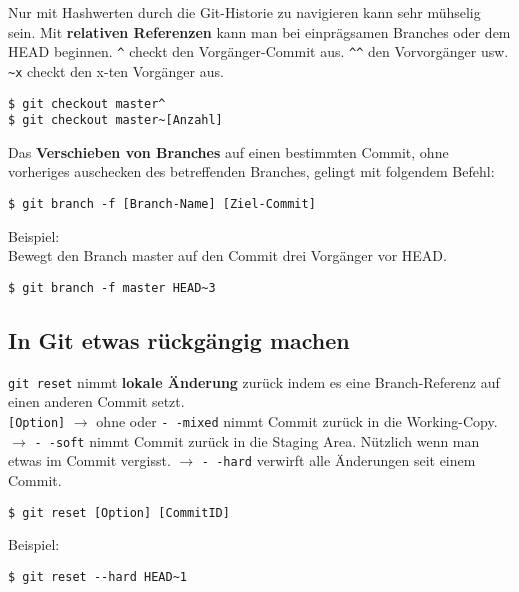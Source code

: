 \documentclass[a4paper,8pt,landscape,twocolumn]{scrartcl}
\begin{document}
\begin{orangeBox}
Nur mit Hashwerten durch die Git-Historie zu navigieren kann sehr mühselig sein. Mit \textbf{relativen Referenzen} kann man bei einprägsamen Branches oder dem HEAD beginnen. \texttt{\^{}} checkt den Vorgänger-Commit aus. \texttt{\^{}\^{}} den Vorvorgänger usw. \texttt{ \textasciitilde x} checkt den x-ten Vorgänger aus.
\begin{lstlisting}[style=bash]
$ git checkout master^
$ git checkout master~[Anzahl]
\end{lstlisting}
\end{orangeBox}

\begin{orangeBox}
Das \textbf{Verschieben von Branches} auf einen bestimmten Commit, ohne vorheriges auschecken des betreffenden Branches, gelingt mit folgendem Befehl:
\begin{lstlisting}[style=bash]
$ git branch -f [Branch-Name] [Ziel-Commit]
\end{lstlisting}
Beispiel:\\
Bewegt den Branch master auf den Commit drei Vorgänger vor HEAD.
\begin{lstlisting}[style=bash]
$ git branch -f master HEAD~3
\end{lstlisting}
\end{orangeBox}

\subsection{In Git etwas rückgängig machen}
\begin{orangeBox}
\texttt{git reset} nimmt \textbf{lokale Änderung} zurück indem es eine Branch-Referenz auf einen anderen Commit setzt.\\
\texttt{[Option]} $\rightarrow$ ohne oder \texttt{- -mixed} nimmt Commit zurück in die Working-Copy. $\rightarrow$ \texttt{- -soft} nimmt Commit zurück in die Staging Area. Nützlich wenn man etwas im Commit vergisst. $\rightarrow$ \texttt{- -hard} verwirft alle Änderungen seit einem Commit.
\begin{lstlisting}[style=bash]
$ git reset [Option] [CommitID]
\end{lstlisting}
Beispiel:
\begin{lstlisting}[style=bash]
$ git reset --hard HEAD~1
\end{lstlisting}

\end{orangeBox}
\end{document}
